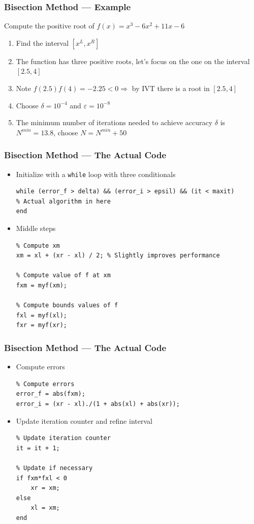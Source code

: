 \documentclass[11pt,xcolor={svgnames},aspectratio=169,usepdftitle=false]{beamer}
\begin{document}
\begin{frame}
  \frametitle{Bisection Method --- Example}
Compute the positive root of $f(x) = x^3 - 6x^2 + 11x - 6$
\begin{enumerate}
  \item Find the interval $[x^L, x^R]$
  \item The function has three positive roots, let's focus on the one on the interval $[2.5, 4]$
  \item Note $f(2.5)f(4) = -2.25 < 0 \Rightarrow$ by IVT there is a root in $[2.5, 4]$
  \item Choose $\delta = 10^{-4}$ and $\varepsilon = 10^{-8}$
  \item The minimum number of iterations needed to achieve accuracy $\delta$ is $N^{min} = 13.8$, choose $N = N^{min} + 50$
\end{enumerate}
\end{frame}

\begin{frame}[fragile]
  \frametitle{Bisection Method --- The Actual Code}
  \begin{itemize}
    \item Initialize with a \verb;while; loop with three conditionals
\begin{lstlisting}
while (error_f > delta) && (error_i > epsil) && (it < maxit)
% Actual algorithm in here
end     
\end{lstlisting}
    \item Middle steps
\begin{lstlisting}
% Compute xm
xm = xl + (xr - xl) / 2; % Slightly improves performance

% Compute value of f at xm
fxm = myf(xm);

% Compute bounds values of f
fxl = myf(xl);
fxr = myf(xr);
\end{lstlisting}
\end{itemize}
\end{frame}

\begin{frame}[fragile]
  \frametitle{Bisection Method --- The Actual Code}
\begin{itemize}
  \item Compute errors
\begin{lstlisting}
% Compute errors
error_f = abs(fxm);
error_i = (xr - xl)./(1 + abs(xl) + abs(xr));
\end{lstlisting}
\item Update iteration counter and refine interval
\begin{lstlisting}
% Update iteration counter
it = it + 1;

% Update if necessary
if fxm*fxl < 0
    xr = xm;
else
    xl = xm;
end
\end{lstlisting}
\end{itemize}
\end{frame}
\end{document}
